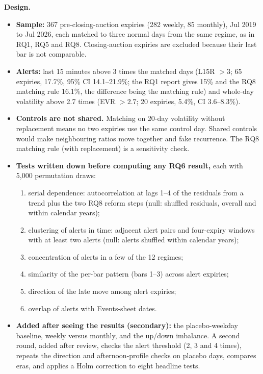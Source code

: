 \documentclass[10pt,a4paper]{article}
\begin{document}
\textbf{Design.}
\begin{itemize}
\item \textbf{Sample:} 367 pre-closing-auction expiries (282 weekly, 85 monthly), Jul 2019 to Jul 2026, each matched to three normal days from the same regime, as in RQ1, RQ5 and RQ8. Closing-auction expiries are excluded because their last bar is not comparable.
\item \textbf{Alerts:} last 15 minutes above 3 times the matched days (L15R $>3$; 65 expiries, 17.7\%, 95\% CI 14.1--21.9\%; the RQ1 report gives 15\% and the RQ8 matching rule 16.1\%, the difference being the matching rule) and whole-day volatility above 2.7 times (EVR $>2.7$; 20 expiries, 5.4\%, CI 3.6--8.3\%).
\item \textbf{Controls are not shared.} Matching on 20-day volatility without replacement means no two expiries use the same control day. Shared controls would make neighbouring ratios move together and fake recurrence. The RQ8 matching rule (with replacement) is a sensitivity check.
\item \textbf{Tests written down before computing any RQ6 result,} each with 5{,}000 permutation draws:
\begin{enumerate}
\item serial dependence: autocorrelation at lags 1--4 of the residuals from a trend plus the two RQ8 reform steps (null: shuffled residuals, overall and within calendar years);
\item clustering of alerts in time: adjacent alert pairs and four-expiry windows with at least two alerts (null: alerts shuffled within calendar years);
\item concentration of alerts in a few of the 12 regimes;
\item similarity of the per-bar pattern (bars 1--3) across alert expiries;
\item direction of the late move among alert expiries;
\item overlap of alerts with Events-sheet dates.
\end{enumerate}
\item \textbf{Added after seeing the results (secondary):} the placebo-weekday baseline, weekly versus monthly, and the up/down imbalance. A second round, added after review, checks the alert threshold (2, 3 and 4 times), repeats the direction and afternoon-profile checks on placebo days, compares eras, and applies a Holm correction to eight headline tests.
\end{itemize}
\end{document}
